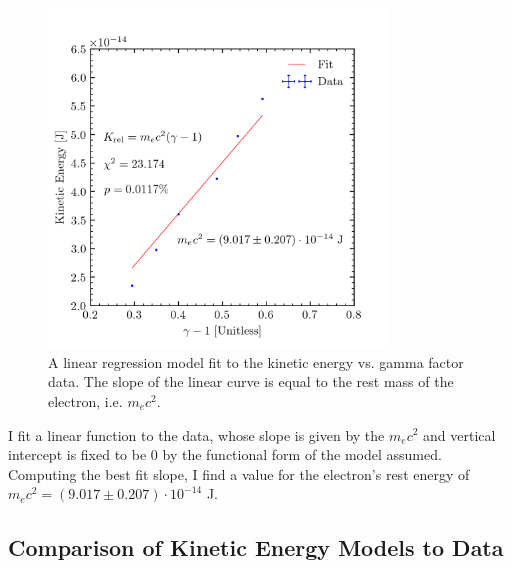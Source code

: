 \documentclass[aps,twocolumn,secnumarabic,balancelastpage,amsmath,amssymb,nofootinbib, floatfix]{revtex4-2}
\begin{document}
	\begin{figure}
		\includegraphics[width=9cm]{k_vs_gamma.png}
		\caption{A linear regression model fit to the kinetic energy vs. gamma factor data. The slope of the linear curve is equal to the rest mass of the electron, i.e. $m_{e}c^{2}$.}
		\label{fig:restmassfit}
	\end{figure}
	
	
	I fit a linear function to the data, whose slope is given by the $m_{e}c^{2}$ and vertical intercept is fixed to be 0 by the functional form of the model assumed. Computing the best fit slope, I find a value for the electron's rest energy of $m_{e}c^{2}=(9.017\pm 0.207)\cdot 10^{-14}$ J.
	
	\subsection{Comparison of Kinetic Energy Models to Data}
	
\end{document}
